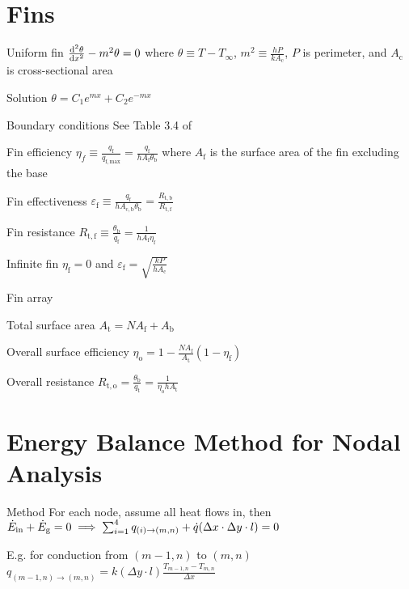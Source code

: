 \documentclass{article}
\begin{document}
\begin{multicols}{2}
\setlength{\columnseprule}{0.5pt}

\section{Fins}
\label{sec:fins}

\begin{description*}
\item[Uniform fin]
  \(\od[2]{\theta}{x} - m^2\theta = 0\) where
  \(\theta \equiv T-T_\infty\),
  \(m^2 \equiv \frac{hP}{kA_\mathrm{c}}\),
  $P$ is perimeter, and
  $A_\mathrm{c}$ is cross-sectional area
  \begin{description*}
  \item[Solution]
    \(\theta = C_1e^{mx} + C_2e^{-mx}\)
  \item[Boundary conditions] See Table 3.4 of \cite{hamt}
  \end{description*}
\item[Fin efficiency]
  \(\eta_f \equiv \frac{q_\mathrm{f}}{q_\mathrm{f,max}}
  = \frac{q_\mathrm{f}}{hA_\mathrm{f}\theta_\mathrm{b}}\)
  where $A_\mathrm{f}$ is the surface area of the fin excluding the base
\item[Fin effectiveness]
  \(\varepsilon_\mathrm{f} \equiv \frac{q_\mathrm{f}}{hA_\mathrm{c,b}\theta_\mathrm{b}}
  = \frac{R_\mathrm{t,b}}{R_\mathrm{t,f}}\)
\item[Fin resistance]
  \(R_\mathrm{t,f} \equiv \frac{\theta_\mathrm{b}}{q_\mathrm{f}}
  = \frac{1}{hA_\mathrm{f}\eta_\mathrm{f}}\)
\item[Infinite fin]
  \(\eta_\mathrm{f} = 0\) and
  \(\varepsilon_\mathrm{f} = \sqrt{\frac{kP}{hA_\mathrm{c}}}\)
\item[Fin array]~
  \begin{description*}
  \item[Total surface area]
    \(A_\mathrm{t} = NA_\mathrm{f} + A_\mathrm{b}\)
  \item[Overall surface efficiency]
    \(\eta_\mathrm{o} = 1 - \frac{NA_\mathrm{f}}{A_\mathrm{t}}(1-\eta_\mathrm{f})\)
  \item[Overall resistance]
    \(R_\mathrm{t,o} = \frac{\theta_\mathrm{b}}{q_\mathrm{t}}
    = \frac{1}{\eta_\mathrm{o}hA_\mathrm{t}}\)
  \end{description*}
\end{description*}

\section{Energy Balance Method for Nodal Analysis}
\begin{description*}
\item[Method] For each node, assume all heat flows in, then
  \(\dot{E}_\mathrm{in} + \dot{E}_\mathrm{g} = 0 \\
  \implies \sum_{i=1}^4q_{(i)\rightarrow(m,n)} + \dot{q}(\Delta{}x\cdot\Delta{}y\cdot{}l) = 0\)
\item[E.g. for conduction from $(m-1,n)$ to $(m,n)$]
  \(q_{(m-1,n)\rightarrow(m,n)} = k(\Delta{}y\cdot{}l)\frac{T_{m-1,n}-T_{m,n}}{\Delta{}x}\)
\end{description*}


\end{multicols}
\end{document}
